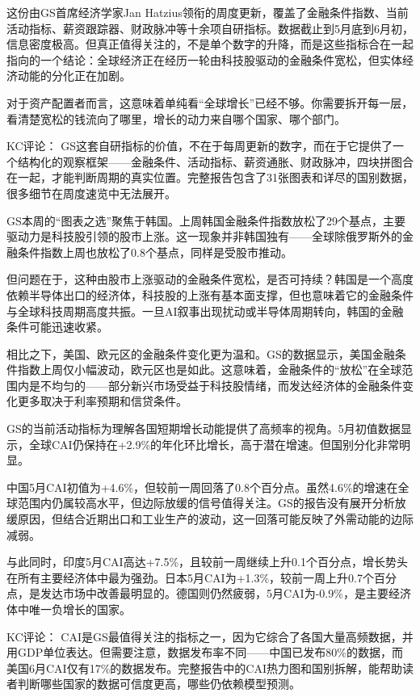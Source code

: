 \documentclass[11pt]{ctexart}
\begin{document}
这份由GS首席经济学家Jan Hatzius领衔的周度更新，覆盖了金融条件指数、当前活动指标、薪资跟踪器、财政脉冲等十余项自研指标。数据截止到5月底到6月初，信息密度极高。但真正值得关注的，不是单个数字的升降，而是这些指标合在一起指向的一个结论：全球经济正在经历一轮由科技股驱动的金融条件宽松，但实体经济动能的分化正在加剧。

对于资产配置者而言，这意味着单纯看“全球增长”已经不够。你需要拆开每一层，看清楚宽松的钱流向了哪里，增长的动力来自哪个国家、哪个部门。

KC评论： GS这套自研指标的价值，不在于每周更新的数字，而在于它提供了一个结构化的观察框架——金融条件、活动指标、薪资通胀、财政脉冲，四块拼图合在一起，才能判断周期的真实位置。完整报告包含了31张图表和详尽的国别数据，很多细节在周度速览中无法展开。

GS本周的“图表之选”聚焦于韩国。上周韩国金融条件指数放松了29个基点，主要驱动力是科技股引领的股市上涨。这一现象并非韩国独有——全球除俄罗斯外的金融条件指数上周也放松了0.8个基点，同样是受股市推动。

但问题在于，这种由股市上涨驱动的金融条件宽松，是否可持续？韩国是一个高度依赖半导体出口的经济体，科技股的上涨有基本面支撑，但也意味着它的金融条件与全球科技周期高度共振。一旦AI叙事出现扰动或半导体周期转向，韩国的金融条件可能迅速收紧。

相比之下，美国、欧元区的金融条件变化更为温和。GS的数据显示，美国金融条件指数上周仅小幅波动，欧元区也是如此。这意味着，金融条件的“放松”在全球范围内是不均匀的——部分新兴市场受益于科技股情绪，而发达经济体的金融条件变化更多取决于利率预期和信贷条件。

GS的当前活动指标为理解各国短期增长动能提供了高频率的视角。5月初值数据显示，全球CAI仍保持在+2.9\%的年化环比增长，高于潜在增速。但国别分化非常明显。

中国5月CAI初值为+4.6\%，但较前一周回落了0.8个百分点。虽然4.6\%的增速在全球范围内仍属较高水平，但边际放缓的信号值得关注。GS的报告没有展开分析放缓原因，但结合近期出口和工业生产的波动，这一回落可能反映了外需动能的边际减弱。

与此同时，印度5月CAI高达+7.5\%，且较前一周继续上升0.1个百分点，增长势头在所有主要经济体中最为强劲。日本5月CAI为+1.3\%，较前一周上升0.7个百分点，是发达市场中改善最明显的。德国则仍然疲弱，5月CAI为-0.9\%，是主要经济体中唯一负增长的国家。

KC评论： CAI是GS最值得关注的指标之一，因为它综合了各国大量高频数据，并用GDP单位表达。但需要注意，数据发布率不同——中国已发布80\%的数据，而美国6月CAI仅有17\%的数据发布。完整报告中的CAI热力图和国别拆解，能帮助读者判断哪些国家的数据可信度更高，哪些仍依赖模型预测。
\end{document}
